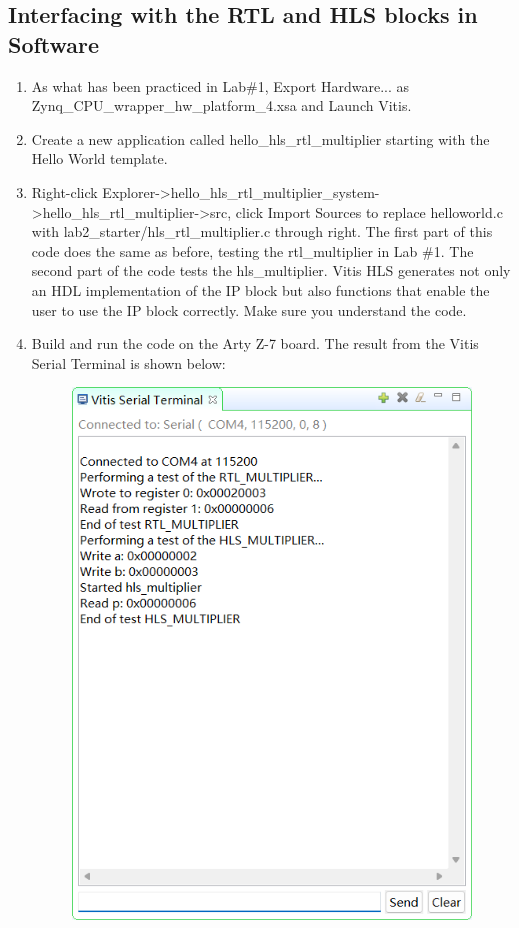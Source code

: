 \documentclass[a4paper,12pt,twoside]{article}
\begin{document}
\subsection{Interfacing with the RTL and HLS blocks in Software}
\begin{enumerate}
    \item As what has been practiced in Lab\#1, Export Hardware... as\\
    Zynq\_CPU\_wrapper\_hw\_platform\_4.xsa and Launch Vitis.
    \item Create a new application called hello\_hls\_rtl\_multiplier starting with the Hello World template.
    \item Right-click Explorer->hello\_hls\_rtl\_multiplier\_system->hello\_hls\_rtl\_multiplier->src, click Import Sources to replace helloworld.c with lab2\_starter/hls\_rtl\_multiplier.c through right. The first part of this code does the same as before, testing the rtl\_multiplier in Lab \#1. The second part of the code tests the hls\_multiplier. Vitis HLS generates not only an HDL implementation of the IP block but also functions that enable the user to use the IP block correctly. Make sure you understand the code.
    \item Build and run the code on the Arty Z-7 board. The result from the Vitis Serial Terminal is shown below:
    \begin{figure}[H]
        \centering
        \includegraphics[width=\textwidth]{images/4.png}
    \end{figure}
\end{enumerate}
\end{document}
